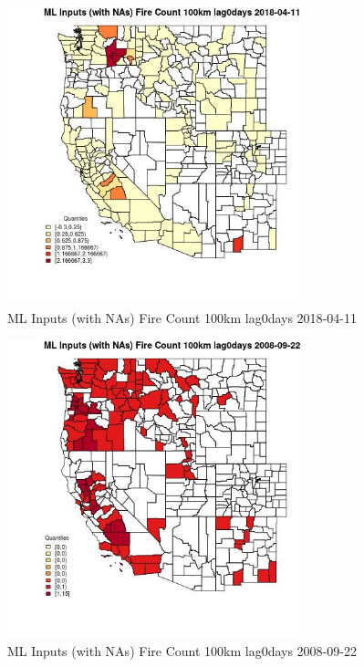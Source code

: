 \begin{figure} 
\centering  
\includegraphics[width=0.77\textwidth]{Code_Outputs/Report_ML_input_PM25_Step4_part_e_de_duplicated_aves_compiled_2019-05-18wNAs_CountyFire_Count_100km_lag0daysMean2018-04-11_2018-04-11.jpg} 
\caption{\label{fig:Report_ML_input_PM25_Step4_part_e_de_duplicated_aves_compiled_2019-05-18wNAsCountyFire_Count_100km_lag0daysMean2018-04-11_2018-04-11}ML Inputs (with NAs) Fire Count 100km lag0days 2018-04-11} 
\end{figure} 
 

\begin{figure} 
\centering  
\includegraphics[width=0.77\textwidth]{Code_Outputs/Report_ML_input_PM25_Step4_part_e_de_duplicated_aves_compiled_2019-05-18wNAs_CountyFire_Count_100km_lag0daysMean2008-09-22_2008-09-22.jpg} 
\caption{\label{fig:Report_ML_input_PM25_Step4_part_e_de_duplicated_aves_compiled_2019-05-18wNAsCountyFire_Count_100km_lag0daysMean2008-09-22_2008-09-22}ML Inputs (with NAs) Fire Count 100km lag0days 2008-09-22} 
\end{figure} 
 

